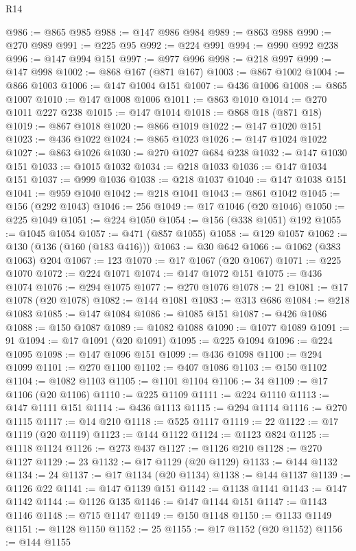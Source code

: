 \begin{lexlean}{R14}
\begin{coremodule}
@986 := @865 @985
@988 := @147 @986 @984
@989 := @863 @988
@990 := @270 @989
@991 := @225 @95
@992 := @224 @991
@994 := @990 @992 @238
@996 := @147 @994 @151
@997 := @977 @996
@998 := @218 @997
@999 := @147 @998
@1002 := @868 @167 (@871 @167)
@1003 := @867 @1002
@1004 := @866 @1003
@1006 := @147 @1004 @151
@1007 := @436 @1006
@1008 := @865 @1007
@1010 := @147 @1008 @1006
@1011 := @863 @1010
@1014 := @270 @1011 @227 @238
@1015 := @147 @1014
@1018 := @868 @18 (@871 @18)
@1019 := @867 @1018
@1020 := @866 @1019
@1022 := @147 @1020 @151
@1023 := @436 @1022
@1024 := @865 @1023
@1026 := @147 @1024 @1022
@1027 := @863 @1026
@1030 := @270 @1027 @684 @238
@1032 := @147 @1030 @151
@1033 := @1015 @1032
@1034 := @218 @1033
@1036 := @147 @1034 @151
@1037 := @999 @1036
@1038 := @218 @1037
@1040 := @147 @1038 @151
@1041 := @959 @1040
@1042 := @218 @1041
@1043 := @861 @1042
@1045 := @156 (@292 @1043)
@1046 := 256
@1049 := @17 @1046 (@20 @1046)
@1050 := @225 @1049
@1051 := @224 @1050
@1054 := @156 (@338 @1051) @192
@1055 := @1045 @1054
@1057 := @471 (@857 @1055)
@1058 := @129 @1057
@1062 := @130 (@136 (@160 (@183 @416)))
@1063 := @30 @642
@1066 := @1062 (@383 @1063) @204
@1067 := 123
@1070 := @17 @1067 (@20 @1067)
@1071 := @225 @1070
@1072 := @224 @1071
@1074 := @147 @1072 @151
@1075 := @436 @1074
@1076 := @294 @1075
@1077 := @270 @1076
@1078 := 21
@1081 := @17 @1078 (@20 @1078)
@1082 := @144 @1081
@1083 := @313 @686
@1084 := @218 @1083
@1085 := @147 @1084
@1086 := @1085 @151
@1087 := @426 @1086
@1088 := @150 @1087
@1089 := @1082 @1088
@1090 := @1077 @1089
@1091 := 91
@1094 := @17 @1091 (@20 @1091)
@1095 := @225 @1094
@1096 := @224 @1095
@1098 := @147 @1096 @151
@1099 := @436 @1098
@1100 := @294 @1099
@1101 := @270 @1100
@1102 := @407 @1086
@1103 := @150 @1102
@1104 := @1082 @1103
@1105 := @1101 @1104
@1106 := 34
@1109 := @17 @1106 (@20 @1106)
@1110 := @225 @1109
@1111 := @224 @1110
@1113 := @147 @1111 @151
@1114 := @436 @1113
@1115 := @294 @1114
@1116 := @270 @1115
@1117 := @14 @210
@1118 := @525 @1117
@1119 := 22
@1122 := @17 @1119 (@20 @1119)
@1123 := @144 @1122
@1124 := @1123 @824
@1125 := @1118 @1124
@1126 := @273 @437
@1127 := @1126 @210
@1128 := @270 @1127
@1129 := 23
@1132 := @17 @1129 (@20 @1129)
@1133 := @144 @1132
@1134 := 24
@1137 := @17 @1134 (@20 @1134)
@1138 := @144 @1137
@1139 := @1126 @22
@1141 := @147 @1139 @151
@1142 := @1138 @1141
@1143 := @147 @1142
@1144 := @1126 @135
@1146 := @147 @1144 @151
@1147 := @1143 @1146
@1148 := @715 @1147
@1149 := @150 @1148
@1150 := @1133 @1149
@1151 := @1128 @1150
@1152 := 25
@1155 := @17 @1152 (@20 @1152)
@1156 := @144 @1155

\end{coremodule}
\end{lexlean}

